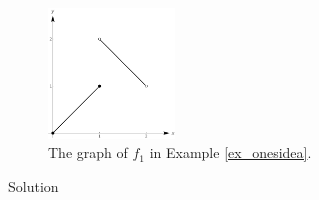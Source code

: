 \begin{example}
\begin{figure}[H]
	\begin{center}
			\includegraphics[width=0.3\textwidth]{fig_lim_12}
	\caption{The graph of $f_1$ in Example \ref{ex_onesidea}. }
	\label{fig_lim_12}
	\end{center}
\end{figure}


Solution 


\end{example}
